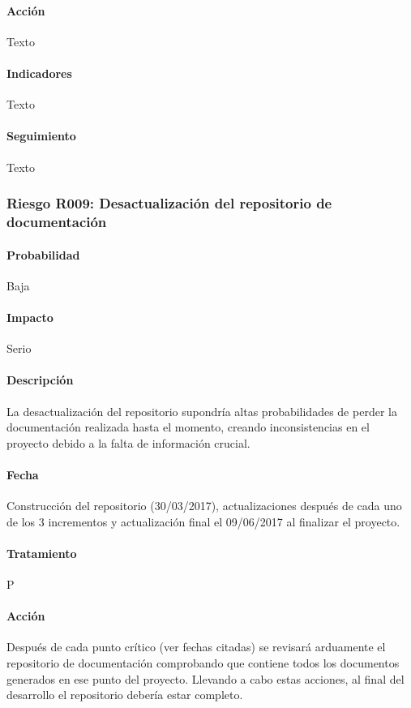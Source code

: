 \documentclass[10pt,a4paper]{article}
\begin{document}
				\paragraph{Acción} Texto %
				\paragraph{Indicadores} Texto %
				\paragraph{Seguimiento}	Texto %
								
				\subsubsection{Riesgo R009: Desactualización del repositorio de documentación}
				\paragraph{Probabilidad} Baja
				\paragraph{Impacto}	Serio
				\paragraph{Descripción} La desactualización del repositorio supondría altas probabilidades de perder la documentación realizada hasta el momento, creando inconsistencias en el proyecto debido a la falta de información crucial. 
				\paragraph{Fecha} Construcción del repositorio (30/03/2017), actualizaciones después de cada uno de los 3 incrementos y actualización final el 09/06/2017 al finalizar el proyecto.
				\paragraph{Tratamiento} P
				\paragraph{Acción} Después de cada punto crítico (ver fechas citadas) se revisará arduamente el repositorio de documentación comprobando que contiene todos los documentos generados en ese punto del proyecto.	Llevando a cabo estas acciones, al final del desarrollo el repositorio debería estar completo.			
\end{document}
